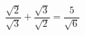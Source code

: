 $\dfrac{\sqrt{2}}{\sqrt{3}}+\dfrac{\sqrt{3}}{\sqrt{2}} = \dfrac{5}{\sqrt{6}}$

\begin{reponses}
\end{reponses}

